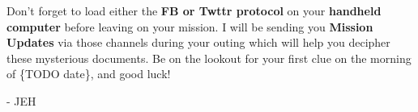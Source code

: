 \documentclass{puzzlehunt}
\begin{document}
Don't forget to load either the \textbf{FB or Twttr protocol} on your
\textbf{handheld computer} before leaving on your mission. I will be sending
you \textbf{Mission Updates} via those channels during your outing which
will help you decipher these mysterious documents. Be on the lookout for
your first clue on the morning of \{TODO date\}, and good luck!

- JEH







\end{document}

